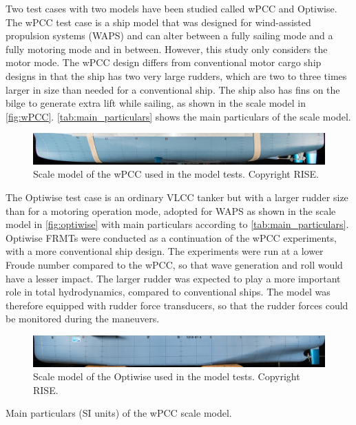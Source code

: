 \noindent Two test cases with two models have been studied called wPCC and Optiwise. The wPCC test case is a ship model that was designed for wind-assisted propulsion systems (WAPS) and can alter between a fully sailing mode and a fully motoring mode and in between. 
However, this study only considers the motor mode. The wPCC design differs from conventional motor cargo ship designs in that the ship has two very large rudders, which are two to three times larger in size than needed for a conventional ship. The ship also has fins on the bilge to generate extra lift while sailing, as shown in the scale model in \autoref{fig:wPCC}.
\autoref{tab:main_particulars} shows the main particulars of the scale model. 

\begin{figure}[h]
    \centering
    \includegraphics[width=\columnwidth]{figures/5m2.jpg}
    \caption{Scale model of the wPCC used in the model tests. Copyright RISE.}
    \label{fig:wPCC}
\end{figure}

The Optiwise test case is an ordinary VLCC tanker but with a larger rudder size than for a motoring operation mode, adopted for WAPS as shown in the scale model in \autoref{fig:optiwise} with main particulars according to \autoref{tab:main_particulars}.
Optiwise FRMTs were conducted as a continuation of the wPCC experiments, with a more conventional ship design. The experiments were run at a lower Froude number compared to the wPCC, so that wave generation and roll would have a lesser impact. The larger rudder was expected to play a more important role in total hydrodynamics, compared to conventional ships. The model was therefore equipped with rudder force transducers, so that the rudder forces could be monitored during the maneuvers. 
\begin{figure}[h]
    \centering
    \includegraphics[width=\columnwidth]{figures/optiwise.jpg}
    \caption{Scale model of the Optiwise used in the model tests. Copyright RISE.}
    \label{fig:optiwise}
\end{figure}
\begin{table}[h]
    \centering
    \scriptsize
    \caption{Main particulars (SI units) of the wPCC scale model.}
    \label{tab:main_particulars}
\end{table}